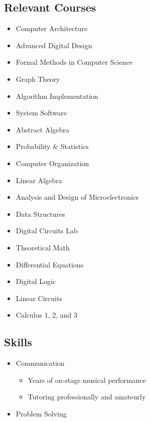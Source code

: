 \documentclass[18pt]{article}
\providecommand{\tightlist}{%
    \setlength{\itemsep}{0pt}\setlength{\parskip}{0pt}}
\begin{document}
\begin{multicols}{2}
\subsection*{Relevant Courses}\label{relevant-courses}
\begin{itemize}
\item
  Computer Architecture
\item
  Advanced Digital Design
\item
  Formal Methods in Computer Science
\item
  Graph Theory
\item
  Algorithm Implementation
\item
  System Software
\item
  Abstract Algebra
\item
  Probability \& Statistics
\item
  Computer Organization
\item
  Linear Algebra
\item
  Analysis and Design of Microelectronics
\item
  Data Structures
\item
  Digital Circuits Lab
\item
  Theoretical Math
\item
  Differential Equations
\item
  Digital Logic
\item
  Linear Circuits
\item
  Calculus 1, 2, and 3
\end{itemize} 

\vfill
\columnbreak
\subsection*{Skills}\label{skills}

\begin{itemize}
\tightlist
\item
  Communication

  \begin{itemize}
  \tightlist
  \item
    Years of on-stage musical performance
  \item
    Tutoring professionally and amateurly
  \end{itemize}
\item
  Problem Solving


\end{itemize}
\end{multicols}
\end{document}
